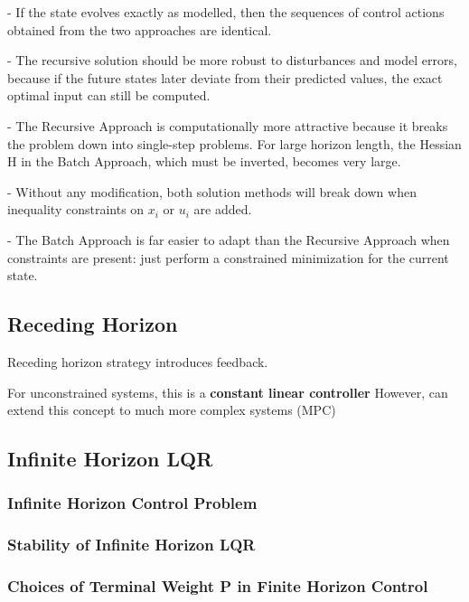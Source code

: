 - If the state evolves exactly as modelled,
then the sequences of control actions obtained from
the two approaches are identical.

- The recursive solution should be more robust to disturbances and model
errors, because if the future states later deviate from their predicted
values, the exact optimal input can still be computed.

- The Recursive Approach is computationally more attractive because it
breaks the problem down into single-step problems. For large horizon
length, the Hessian H in the Batch Approach, which must be inverted,
becomes very large.

- Without any modification, both solution methods will break down when
inequality constraints on $x_i$ or $u_i$ are added.

- The Batch Approach is far easier to adapt than the Recursive Approach
when constraints are present: just perform a constrained minimization for
the current state.

\subsection{Receding Horizon}

Receding horizon strategy introduces feedback.


For unconstrained systems, this is a \textbf{constant linear controller}
However, can extend this concept to much more complex systems (MPC)


\subsection{Infinite Horizon LQR}

\subsubsection{Infinite Horizon Control Problem}


\subsubsection{Stability of Infinite Horizon LQR}


\subsubsection{Choices of Terminal Weight P in Finite Horizon Control}

